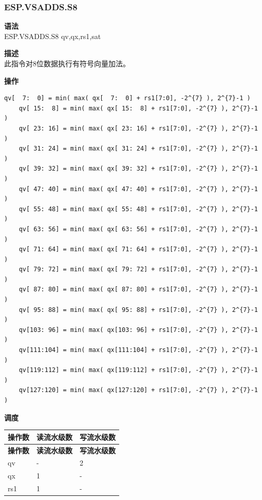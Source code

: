 \newpage

\newpage
\subsubsection{ESP.VSADDS.S8}\label{instruction:ESPVSADDSS8}
\textbf{语法}\\
ESP.VSADDS.S8 qv,qx,rs1,sat

\textbf{描述}\\
此指令对8位数据执行有符号向量加法。

\textbf{操作}\\
\begin{lstlisting}[escapeinside=`?]
    qv[  7:  0] = min( max( qx[  7:  0] + rs1[7:0], -2^{7} ), 2^{7}-1 )
    qv[ 15:  8] = min( max( qx[ 15:  8] + rs1[7:0], -2^{7} ), 2^{7}-1 )
    qv[ 23: 16] = min( max( qx[ 23: 16] + rs1[7:0], -2^{7} ), 2^{7}-1 )
    qv[ 31: 24] = min( max( qx[ 31: 24] + rs1[7:0], -2^{7} ), 2^{7}-1 )
    qv[ 39: 32] = min( max( qx[ 39: 32] + rs1[7:0], -2^{7} ), 2^{7}-1 )
    qv[ 47: 40] = min( max( qx[ 47: 40] + rs1[7:0], -2^{7} ), 2^{7}-1 )
    qv[ 55: 48] = min( max( qx[ 55: 48] + rs1[7:0], -2^{7} ), 2^{7}-1 )
    qv[ 63: 56] = min( max( qx[ 63: 56] + rs1[7:0], -2^{7} ), 2^{7}-1 )
    qv[ 71: 64] = min( max( qx[ 71: 64] + rs1[7:0], -2^{7} ), 2^{7}-1 )
    qv[ 79: 72] = min( max( qx[ 79: 72] + rs1[7:0], -2^{7} ), 2^{7}-1 )
    qv[ 87: 80] = min( max( qx[ 87: 80] + rs1[7:0], -2^{7} ), 2^{7}-1 )
    qv[ 95: 88] = min( max( qx[ 95: 88] + rs1[7:0], -2^{7} ), 2^{7}-1 )
    qv[103: 96] = min( max( qx[103: 96] + rs1[7:0], -2^{7} ), 2^{7}-1 )
    qv[111:104] = min( max( qx[111:104] + rs1[7:0], -2^{7} ), 2^{7}-1 )
    qv[119:112] = min( max( qx[119:112] + rs1[7:0], -2^{7} ), 2^{7}-1 )
    qv[127:120] = min( max( qx[127:120] + rs1[7:0], -2^{7} ), 2^{7}-1 )
\end{lstlisting}

\textbf{调度}\\
\begin{longtable}[c]{|l|l|l|}
    \hline
    \rowcolor{lightgray}
    \textbf{操作数} & \textbf{读流水级数} & \textbf{写流水级数} \\\hline
    \endfirsthead
    \hline
    \rowcolor{lightgray}
     \textbf{操作数} & \textbf{读流水级数} & \textbf{写流水级数} \\\hline
    \endhead
    \hline
    \endfoot

  qv & - & 2 \\\hline
    qx & 1 & - \\\hline
    rs1 & 1 & -

\end{longtable}

